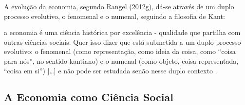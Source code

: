 \documentclass[
	12pt,				%
	oneside,			%
	a4paper,			%
	chapter=TITLE,		%
	section=TITLE,		%
	english,			%
	brazil				%
	]{abntex2}
\begin{document}
A evolução da economia, segundo Rangel (\protect\hyperlink{ref-rangel1956}{2012}\protect\hyperlink{ref-rangel1956}{g}), dá-se através de um
duplo processo evolutivo, o fenomenal e o numenal, seguindo a filosofia de Kant:
\begin{citacao}
a economia é uma ciência histórica por excelência - qualidade que partilha com
outras ciências sociais. Quer isso dizer que está submetida a um duplo processo
evolutivo: o fenomenal (como representação, como ideia da coisa, como ``coisa
para nós'', no sentido kantiano) e o numenal (como objeto, coisa representada,
``coisa em si'') [\ldots] e não pode ser estudada senão nesse duplo contexto
\cite[p.~204]{rangel1956}.
\end{citacao}
\hypertarget{a-economia-como-ciuxeancia-social}{%
\subsection{A Economia como Ciência Social}\label{a-economia-como-ciuxeancia-social}}
\end{document}
